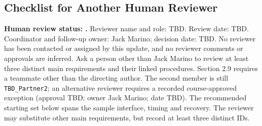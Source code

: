 \subsection{Checklist for Another Human Reviewer}
\label{Section:HumanReviewChecklist}
\textbf{Human review status: \StatusPending.}
Reviewer name and role: TBD. Review date: TBD. Coordinator and follow-up owner:
Jack Marino; decision date: TBD. No reviewer has been contacted or assigned by
this update, and no reviewer comments or approvals are inferred.
Ask a person other than Jack Marino to review at least three distinct main
requirements and their linked procedures. Section 2.9 requires a teammate other than the directing author. The second
member is still \texttt{TBD\_Partner2}; an alternative reviewer requires a
recorded course-approved exception (approval TBD; owner Jack Marino; date TBD). The recommended
starting set below spans the sample interface, timing and recovery. The reviewer
may substitute other main requirements, but record at least three distinct IDs.


